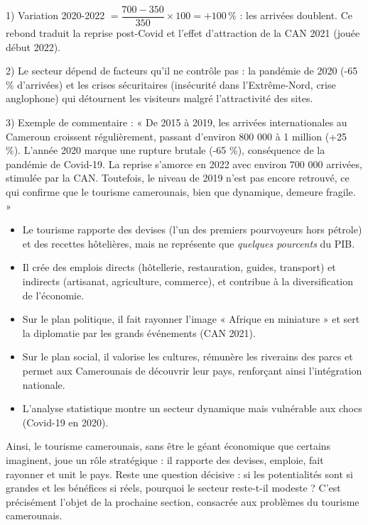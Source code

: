 \documentclass[11pt]{article}
\newcommand{\cle}[1]{{\popxbold\color{popdark}#1}}
\begin{document}
\begin{corrige}[Exercice]
1) Variation 2020-2022 $= \dfrac{700 - 350}{350} \times 100 = +100\,\%$ : les arrivées doublent. Ce rebond traduit la reprise post-Covid et l'effet d'attraction de la CAN 2021 (jouée début 2022). \par
2) Le secteur dépend de facteurs qu'il ne contrôle pas : la pandémie de 2020 (-65 \% d'arrivées) et les crises sécuritaires (insécurité dans l'Extrême-Nord, crise anglophone) qui détournent les visiteurs malgré l'attractivité des sites. \par
3) Exemple de commentaire : « De 2015 à 2019, les arrivées internationales au Cameroun croissent régulièrement, passant d'environ 800 000 à 1 million (+25 \%). L'année 2020 marque une rupture brutale (-65 \%), conséquence de la pandémie de Covid-19. La reprise s'amorce en 2022 avec environ 700 000 arrivées, stimulée par la CAN. Toutefois, le niveau de 2019 n'est pas encore retrouvé, ce qui confirme que le tourisme camerounais, bien que dynamique, demeure fragile. »
\end{corrige}

\begin{aretenir}
\begin{itemize}
\item Le tourisme rapporte des \cle{devises} (l'un des premiers pourvoyeurs hors pétrole) et des recettes hôtelières, mais ne représente que \emph{quelques pourcents} du PIB.
\item Il crée des emplois \cle{directs} (hôtellerie, restauration, guides, transport) et \cle{indirects} (artisanat, agriculture, commerce), et contribue à la \cle{diversification} de l'économie.
\item Sur le plan \cle{politique}, il fait rayonner l'image « Afrique en miniature » et sert la diplomatie par les grands événements (CAN 2021).
\item Sur le plan \cle{social}, il valorise les cultures, rémunère les riverains des parcs et permet aux Camerounais de découvrir leur pays, renforçant ainsi l'\cle{intégration nationale}.
\item L'analyse statistique montre un secteur dynamique mais vulnérable aux chocs (Covid-19 en 2020).
\end{itemize}
\end{aretenir}

Ainsi, le tourisme camerounais, sans être le géant économique que certains imaginent, joue un rôle stratégique : il rapporte des devises, emploie, fait rayonner et unit le pays. Reste une question décisive : si les potentialités sont si grandes et les bénéfices si réels, pourquoi le secteur reste-t-il modeste ? C'est précisément l'objet de la prochaine section, consacrée aux problèmes du tourisme camerounais.
\end{document}

